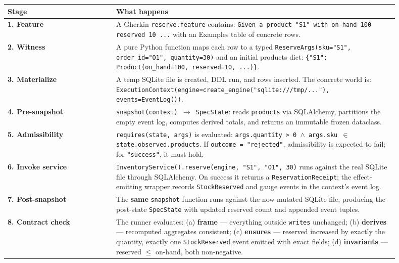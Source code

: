 \documentclass[11pt,a4paper]{article}
\begin{document}
\begin{table}[t]
\centering\small
\begin{tabular}{@{}p{0.25\linewidth}p{0.65\linewidth}@{}}
\toprule
\textbf{Stage} & \textbf{What happens} \\
\midrule
\textbf{1. Feature} &
  A Gherkin \texttt{reserve.feature} contains:
  \texttt{Given a product "S1" with on-hand 100 reserved 10 ...}
  with an Examples table of concrete rows. \\[8pt]

\textbf{2. Witness} &
  A pure Python function maps each row to a typed \texttt{ReserveArgs(sku="S1", order\_id="O1", quantity=30)}
  and an initial products dict: \texttt{\{"S1": Product(on\_hand=100, reserved=10, ...)\}}. \\[8pt]

\textbf{3. Materialize} &
  A temp SQLite file is created, DDL run, and rows inserted.  The concrete world is:
  \texttt{Execution\-Context(engine=create\_engine("sqlite:///tmp/..."), events=EventLog())}. \\[8pt]

\textbf{4. Pre-snapshot} &
  \texttt{snapshot(context) $\to$ SpecState}: reads \texttt{products} via SQLAlchemy,
  partitions the empty event log, computes derived totals, and returns an immutable frozen dataclass. \\[8pt]

\textbf{5. Admissibility} &
  \texttt{requires(state, args)} is evaluated: \texttt{args.quantity > 0 $\land$ args.sku $\in$ state.observed.products}.
  If \texttt{outcome = "rejected"}, admissibility is expected to fail; for \texttt{"success"}, it must hold. \\[8pt]

\textbf{6. Invoke service} &
  \texttt{Inventory\-Service().reserve(engine, "S1", "O1", 30)} runs against the real SQLite file through SQLAlchemy.
  On success it returns a \texttt{Reservation\-Receipt}; the effect-emitting wrapper records
  \texttt{StockReserved} and gauge events in the context's event log. \\[8pt]

\textbf{7. Post-snapshot} &
  The \textbf{same} \texttt{snapshot} function runs against the now-mutated SQLite file,
  producing the post-state \texttt{SpecState} with updated reserved count and appended event tuples. \\[8pt]

\textbf{8. Contract check} &
  The runner evaluates: (a) \textbf{frame} --- everything outside \texttt{writes} unchanged;
  (b) \textbf{derives} --- recomputed aggregates consistent;
  (c) \textbf{ensures} --- reserved increased by exactly the quantity, exactly one
  \texttt{StockReserved} event emitted with exact fields;
  (d) \textbf{invariants} --- reserved $\leq$ on-hand, both non-negative. \\[8pt]


\end{tabular}
\end{table}
\end{document}
